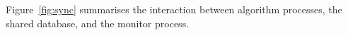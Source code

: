 

Figure~\ref{fig:sync} summarises the interaction between algorithm processes,
the shared database, and the monitor process.

